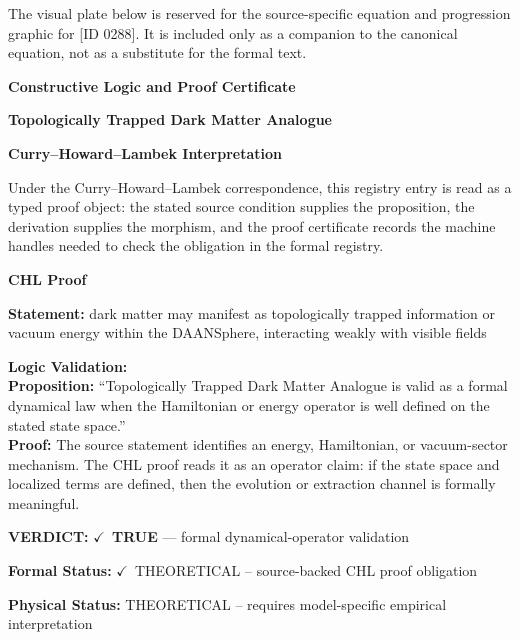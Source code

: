 \begingroup\footnotesize\sloppy
The visual plate below is reserved for the source-specific equation and progression graphic for [ID 0288]. It is included only as a companion to the canonical equation, not as a substitute for the formal text.
\par\endgroup
\ifTZPDarkEdition
{}
\fi

\clearpage
\begingroup\tzpsupportsetup
\noindent\textbf{\fontsize{10.8pt}{12.8pt}\selectfont [ID 0288] Constructive Logic and Proof Certificate}\par
\noindent\textbf{\fontsize{10pt}{12pt}\selectfont Topologically Trapped Dark Matter Analogue}\par
\vspace{0.45em}
\begingroup
\footnotesize
\setlength{\parskip}{0.22em}
\setlength{\parindent}{0pt}
\noindent\textbf{Curry--Howard--Lambek Interpretation}\par
Under the Curry--Howard--Lambek correspondence, this registry entry is read as a typed proof
object: the stated source condition supplies the proposition, the derivation supplies the
morphism, and the proof certificate records the machine handles needed to check the obligation
in the formal registry.

\vspace{0.45em}
\noindent\textbf{CHL Proof}\par
\textbf{Statement:} dark matter may manifest as topologically trapped information or vacuum energy within
the DAANSphere, interacting weakly with visible fields

\textbf{Logic Validation:}\\
\textbf{Proposition:} ``Topologically Trapped Dark Matter Analogue is valid as a formal dynamical law when the
Hamiltonian or energy operator is well defined on the stated state space.''\\
\textbf{Proof:} The source statement identifies an energy, Hamiltonian, or vacuum-sector mechanism. The
CHL proof reads it as an operator claim: if the state space and localized terms are
defined, then the evolution or extraction channel is formally meaningful.

\textbf{VERDICT:} \ensuremath{\checkmark}\ \textbf{TRUE} --- formal dynamical-operator validation

\textbf{Formal Status:} \ensuremath{\checkmark}\ THEORETICAL -- source-backed CHL proof obligation

\textbf{Physical Status:} THEORETICAL -- requires model-specific empirical interpretation
\par\vspace{0.45em}
\par
\ifTZPDarkEdition
{}
\fi
\endgroup
\endgroup
